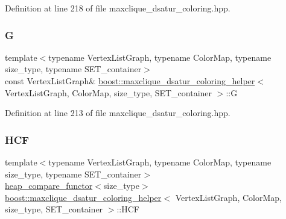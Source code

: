 Definition at line 218 of file maxclique\+\_\+dsatur\+\_\+coloring.\+hpp.

\mbox{\label{classboost_1_1maxclique__dsatur__coloring__helper_af420ca87f673bcf01207bb880bd129e7}} 
\subsubsection{\texorpdfstring{G}{G}}
{\footnotesize\ttfamily template$<$typename Vertex\+List\+Graph, typename Color\+Map, typename size\+\_\+type, typename S\+E\+T\+\_\+container$>$ \\
const Vertex\+List\+Graph\& \hyperlink{classboost_1_1maxclique__dsatur__coloring__helper}{boost\+::maxclique\+\_\+dsatur\+\_\+coloring\+\_\+helper}$<$ Vertex\+List\+Graph, Color\+Map, size\+\_\+type, S\+E\+T\+\_\+container $>$\+::G\hspace{0.3cm}{\ttfamily [private]}}



Definition at line 213 of file maxclique\+\_\+dsatur\+\_\+coloring.\+hpp.

\mbox{\label{classboost_1_1maxclique__dsatur__coloring__helper_ac3684724839cfab3a4cf31ee2f4a84e8}} 
\subsubsection{\texorpdfstring{H\+CF}{HCF}}
{\footnotesize\ttfamily template$<$typename Vertex\+List\+Graph, typename Color\+Map, typename size\+\_\+type, typename S\+E\+T\+\_\+container$>$ \\
\hyperlink{structboost_1_1heap__compare__functor}{heap\+\_\+compare\+\_\+functor}$<$size\+\_\+type$>$ \hyperlink{classboost_1_1maxclique__dsatur__coloring__helper}{boost\+::maxclique\+\_\+dsatur\+\_\+coloring\+\_\+helper}$<$ Vertex\+List\+Graph, Color\+Map, size\+\_\+type, S\+E\+T\+\_\+container $>$\+::H\+CF\hspace{0.3cm}{\ttfamily [private]}}



